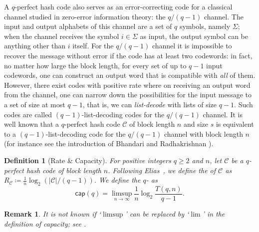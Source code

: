 \documentclass[10pt,a4paper]{article}
\newcommand{\rc}{R_{\mathcal{C}}}
\newcommand{\qklhashcode}{$q$-perfect hash code}
\newcommand{\calC}{\mathcal{C}}
\newcommand{\define}[1]{\textsb{#1}}
\newcommand{\bcap}{\mathsf{cap}}
\newtheorem{definition}{Definition}[section]
\newtheorem{remark}[theorem]{Remark}
\DeclareMathOperator{\1}{\mathbf{1}}
\begin{document}
A \qklhashcode{} also serves as an error-correcting code for a classical channel studied in zero-error information theory: the $q/(q-1)$ channel.
The input and output alphabets of this channel are a set of $q$ symbols, namely $\Sigma$; when the channel receives the symbol $i \in \Sigma$ as input, the output symbol can be anything other than $i$ itself.
For the $q/(q-1)$ channel it is impossible to recover the message without error if the code has at least two codewords: in fact, no matter how large the block length, for every set of up to $q-1$ input codewords, one can construct an output word that is compatible with \emph{all} of them.
However, there exist codes with positive rate where on receiving an output word from the channel, one can narrow down the possibilities for the input message to a set of size at most $q-1$, that is, we can \emph{list-decode} with lists of size $q-1$.
Such codes are called $(q-1)$-list-decoding codes for the $q/(q-1)$ channel.
It is well known that a \qklhashcode{} $\calC$ of block length $n$ and size $s$ is equivalent to a $(q-1)$-list-decoding code for the $q/(q-1)$ channel with block length $n$ (for instance see the introduction of Bhandari and Radhakrishnan \cite{BhandariR2022_IEEE_TOIT}).


\begin{definition}[Rate \& Capacity]
	\label{defn:gen_rate_capacity}
	For positive integers $q\geq 2$ and $n$, let $\calC$ be a \qklhashcode{} of block length $n$.
	Following Elias~\cite{Elias1988}, we define the \define{rate} of $\calC$ as $\rc\coloneqq \frac{1}{n} \log_2 (|\calC|/(q-1))$.
	We define the $q$-\define{capacity} as 
\[ \bcap (q) = \limsup_{n \rightarrow \infty}  \frac{1}{n} \log_2 \frac{T(q,n)}{q-1}.\]
\end{definition}

\begin{remark}
It is not known if `$\limsup$' can be replaced by `$\lim$' in the definition of capacity; see \cite[Footnote~1]{Arikan1994}.
\end{remark}
\end{document}
